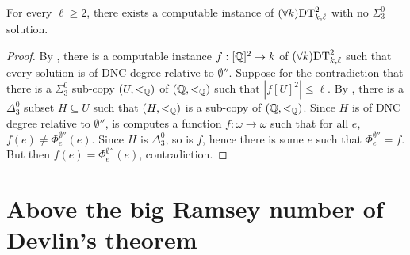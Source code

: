 \begin{corollary}\label{cor:dt2-no-sigma3}
For every $\ell \geq 2$, there exists a computable instance of $(\forall k)\mathrm{DT}^{2}_{k,\ell}$ 
with no $\Sigma^0_3$ solution.
\end{corollary}
\begin{proof}
By , there is a computable instance $f: [\mathbb{Q}]^2 \to k$ of $(\forall k)\mathrm{DT}^{2}_{k,\ell}$ such that every solution is of DNC degree relative to $\emptyset''$.
Suppose for the contradiction that there is a $\Sigma^0_3$ sub-copy $(U, <_{\mathbb{Q}})$ of $(\mathbb{Q}, <_{\mathbb{Q}})$ such that $|f[U]^2| \leq \ell$.
By , there is a $\Delta^0_3$ subset $H \subseteq U$ such that $(H, <_{\mathbb{Q}})$ is a sub-copy of $(\mathbb{Q}, <_{\mathbb{Q}})$.
Since $H$ is of DNC degree relative to $\emptyset''$, is computes a function $f: \omega \to \omega$ such that for all $e$, $f(e) \neq \Phi^{\emptyset''}_e(e)$. Since $H$ is $\Delta^0_3$, so is $f$, hence there is some $e$ such that $\Phi_e^{\emptyset''} = f$.
But then $f(e) = \Phi_e^{\emptyset''}(e)$, contradiction.
\end{proof}


%
%

\section{Above the big Ramsey number of Devlin's theorem}

